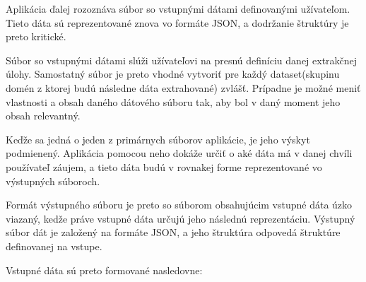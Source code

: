 Aplikácia ďalej rozoznáva súbor so vstupnými dátami definovanými užívateľom. Tieto dáta sú reprezentované znova vo formáte JSON, a dodržanie štruktúry je preto kritické. 

Súbor so vstupnými dátami slúži užívateľovi na presnú definíciu danej extrakčnej úlohy. Samostatný súbor je preto vhodné vytvoriť pre každý dataset(skupinu domén z ktorej budú následne dáta extrahované) zvlášť. Prípadne je možné meniť vlastnosti a obsah daného dátového súboru tak, aby bol v daný moment jeho obsah relevantný. 

Keďže sa jedná o jeden z primárnych súborov aplikácie, je jeho výskyt podmienený. Aplikácia pomocou neho dokáže určiť o aké dáta má v danej chvíli používateľ záujem, a tieto dáta budú v rovnakej forme reprezentované vo výstupných súboroch.

Formát výstupného súboru je preto so súborom obsahujúcim vstupné dáta úzko viazaný, kedže práve vstupné dáta určujú jeho následnú reprezentáciu. Výstupný súbor dát je založený na formáte JSON, a jeho štruktúra odpovedá štruktúre definovanej na vstupe.

Vstupné dáta sú preto formované nasledovne:

